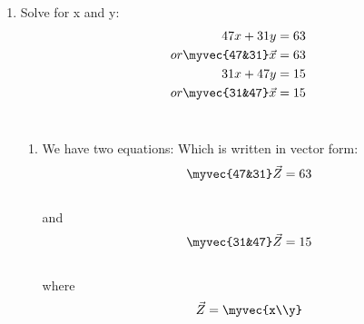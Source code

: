 \documentclass[journal,12pt,twocolumn]{IEEEtran}
\renewcommand\thesection{\arabic{section}}
\begin{document}
\begin{enumerate}[label=\thesection.\arabic*.,ref=\thesection.\theenumi]
\item Solve for x and y: 
\begin{align}
    47x+31y=63 \\or \myvec{47&31}\vec{x}=63\\
31x+47y=15 \\or \myvec{31&47}\vec{x}=15 
\end{align} 
\\
\solution\begin{enumerate}
    \item We have two equations:
    Which is written in vector form:
    \begin{align}\label{eq:1}
        \myvec{47&31}\vec{Z}=63
    \end{align}\\
    and 
    \begin{align}\label{eq:2}
        \myvec{31&47}\vec{Z}=15
    \end{align}
\\where \begin{align}
        \vec{Z}=\myvec{x\\y}
    \end{align}


\end{enumerate}
\end{enumerate}
\end{document}
